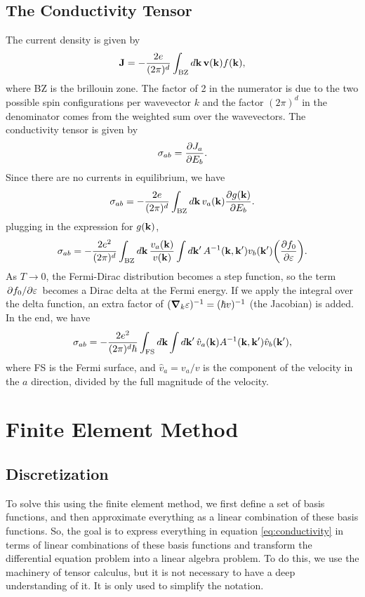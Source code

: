 \documentclass[12pt]{article}
\begin{document}
\subsection{The Conductivity Tensor}
The current density is given by
\begin{equation}
    \vb{J} = -\frac{2e}{(2\pi)^d} \int_{\text{BZ}} \dd{\vb{k}} \vb{v}(\vb{k}) f(\vb{k}),
\end{equation}
where BZ is the brillouin zone. The factor of 2 in the numerator is due to the two possible spin
configurations per wavevector $k$ and the factor $(2\pi)^d$ in the denominator comes from the
weighted sum over the wavevectors. The conductivity tensor is given by
\begin{equation}
    \sigma_{ab} = \pdv{J_a}{E_b}.
\end{equation}
Since there are no currents in equilibrium, we have
\begin{equation}
    \sigma_{ab} = -\frac{2e}{(2\pi)^d} \int_{\text{BZ}}\dd{\vb{k}} v_a(\vb{k}) \pdv{g(\vb{k})}{E_b}.
\end{equation}
plugging in the expression for $g(\vb{k})$,
\begin{equation}
    \sigma_{ab} = -\frac{2e^2}{(2\pi)^d} \int_{\text{BZ}}\dd{\vb{k}} \frac{v_a(\vb{k})}{v(\vb{k})}
    \int\dd{\vb{k'}} A^{-1}(\vb{k}, \vb{k'}) v_b(\vb{k'})\qty(\pdv{f_0}{\varepsilon}).
\end{equation}
As $T\to0$, the Fermi-Dirac distribution becomes a step function, so the term
$\pdv*{f_0}{\varepsilon}$ becomes a Dirac delta at the Fermi energy. If we apply the integral over
the delta function, an extra factor of $(\grad_{k}\varepsilon)^{-1} = (\hbar v)^{-1}$ (the Jacobian)
is added. In the end, we have
\begin{equation}
    \sigma_{ab} = -\frac{2e^2}{(2\pi)^d\hbar} \int_{\text{FS}}\dd{\vb{k}}\int\dd{\vb{k'}}
    \hat{v}_a(\vb{k}) A^{-1}(\vb{k}, \vb{k'}) \hat{v}_b(\vb{k'}),
    \label{eq:conductivity}
\end{equation}
where FS is the Fermi surface, and $\hat{v}_a=v_a/v$ is the component of the velocity in the
$a$ direction, divided by the full magnitude of the velocity.

\section{Finite Element Method}
\subsection{Discretization}
To solve this using the finite element method, we first define a set of basis functions, and then
approximate everything as a linear combination of these basis functions. So, the goal is to express
everything in equation \eqref{eq:conductivity} in terms of linear combinations of these basis
functions and transform the differential equation problem into a linear algebra problem. To do this,
we use the machinery of tensor calculus, but it is not necessary to have a deep understanding of it.
It is only used to simplify the notation.
\end{document}
